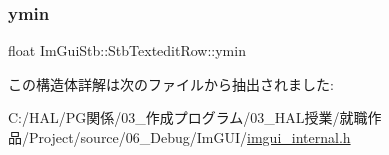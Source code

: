 \mbox{\label{struct_im_gui_stb_1_1_stb_textedit_row_a0c8be0676857e3a182ab73d1782e5da0}} 
\subsubsection{\texorpdfstring{ymin}{ymin}}
{\footnotesize\ttfamily float Im\+Gui\+Stb\+::\+Stb\+Textedit\+Row\+::ymin}



この構造体詳解は次のファイルから抽出されました\+:\begin{DoxyCompactItemize}
\item 
C\+:/\+H\+A\+L/\+P\+G関係/03\+\_\+作成プログラム/03\+\_\+\+H\+A\+L授業/就職作品/\+Project/source/06\+\_\+\+Debug/\+Im\+G\+U\+I/\mbox{\hyperlink{imgui__internal_8h}{imgui\+\_\+internal.\+h}}\end{DoxyCompactItemize}
